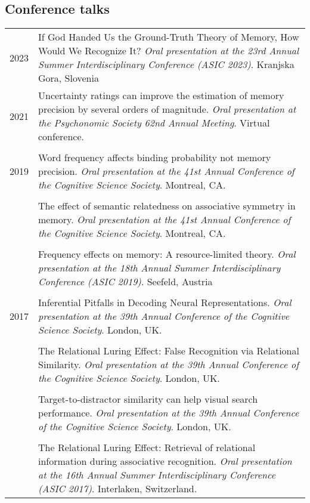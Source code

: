 \documentclass[letterpaper]{article}
\begin{document}
\subsection*{Conference talks}
\begin{longtable}{p{0.7cm}p{15cm}}
2023 & If God Handed Us the Ground-Truth Theory of Memory, How Would We Recognize It? {\it Oral presentation at the 23rd Annual Summer Interdisciplinary Conference (ASIC 2023)}. Kranjska Gora, Slovenia\\[6pt]
2021 & Uncertainty ratings can improve the estimation of memory precision by several orders of magnitude. {\it Oral presentation at the Psychonomic Society 62nd Annual Meeting}. Virtual conference.\\ [6pt]
&\\ 
2019 & Word frequency affects binding probability not memory precision. {\it Oral presentation at the 41st Annual Conference of the Cognitive Science Society}. Montreal, CA.\\[6pt]
 &\\
& The effect of semantic relatedness on associative symmetry in memory. {\it Oral presentation at the 41st Annual Conference of the Cognitive Science Society}. Montreal, CA.\\[6pt]
&\\
& Frequency effects on memory: A resource-limited theory. {\it Oral presentation at the 18th Annual Summer Interdisciplinary Conference (ASIC 2019)}. Seefeld, Austria\\[6pt]
&\\
2017 & Inferential Pitfalls in Decoding Neural Representations. {\it Oral presentation at the 39th Annual Conference of the Cognitive Science Society}. London, UK.\\[6pt]
 &\\
& The Relational Luring Effect: False Recognition via Relational Similarity. {\it Oral presentation at the 39th Annual Conference of the Cognitive Science Society}. London, UK.\\[6pt]
&\\
& Target-to-distractor similarity can help visual search performance. {\it Oral presentation at the 39th Annual Conference of the Cognitive Science Society}. London, UK.\\[6pt]
 &\\
& The Relational Luring Effect: Retrieval of relational information during associative recognition. {\it Oral presentation at the 16th Annual Summer Interdisciplinary Conference (ASIC 2017)}. Interlaken, Switzerland.\\[6pt]

\end{longtable}
\end{document}
